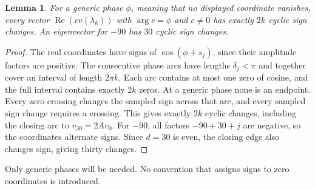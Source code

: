 \documentclass[11pt]{article}
\newtheorem{lemma}[theorem]{Lemma}
\theoremstyle{remark}\newtheorem{remark}[theorem]{Remark}
\DeclareMathOperator{\Rea}{Re}
\numberwithin{equation}{section}
\begin{document}
\begin{lemma}\label{his:o59:eigen-sign}
For a generic phase $\phi$, meaning that no displayed coordinate
vanishes, every vector $\Rea(c v(\lambda_k))$ with $\arg c=\phi$
and $c\ne0$ has exactly $2k$ cyclic sign changes. An eigenvector for
$-90$ has $30$ cyclic sign changes.
\end{lemma}
\begin{proof}
The real coordinates have signs of
$\cos(\phi+s_j)$, since their amplitude factors are positive.
The consecutive phase arcs have lengths $\delta_j<\pi$ and together
cover an interval of length $2\pi k$. Each arc contains at most one
zero of cosine, and the full interval contains exactly $2k$ zeros.
At a generic phase none is an endpoint. Every zero crossing changes
the sampled sign across that arc, and every sampled sign change
requires a crossing. This gives exactly $2k$ cyclic changes, including
the closing arc to $v_{30}=2Av_0$.
For $-90$, all factors $-90+30+j$ are negative, so the coordinates
alternate signs. Since $d=30$ is even, the closing edge also changes
sign, giving thirty changes.
\end{proof}
Only generic phases will be needed. No convention that assigns signs
to zero coordinates is introduced.
\end{document}
